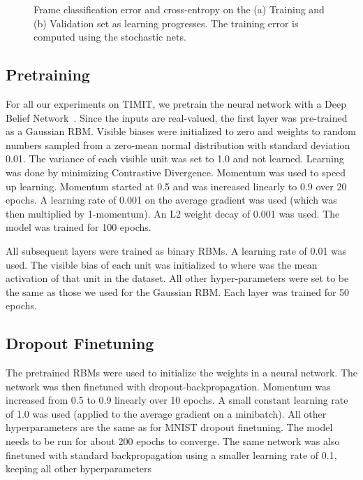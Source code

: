 \documentclass[12pt]{article}
\begin{document}
\begin{figure}[h!]
\centerline{
}
\centerline{
}
\caption{Frame classification error and cross-entropy on the (a) Training and
(b) Validation set as learning progresses. 
The training error is computed using the stochastic nets.}
\label{fig:timit}
\end{figure}

\subsection{Pretraining}
\label{sec:timit_pre}
For all our experiments on TIMIT, we pretrain the neural network with a
Deep Belief Network~\cite{Science}.
Since the inputs are real-valued, the first layer was pre-trained as a Gaussian RBM. Visible biases were initialized
to zero and weights to random numbers sampled from a zero-mean normal distribution with
standard deviation 0.01. The variance of each visible unit was set to 1.0 and
not learned. Learning was done by minimizing Contrastive Divergence. Momentum
was used to speed up learning. Momentum started at 0.5 and was increased
linearly to 0.9 over 20 epochs. A learning rate of 0.001 on the average gradient
was used (which was then multiplied by 1-momentum). An L2 weight decay of 0.001 was used. The model was
trained for 100 epochs.

All subsequent layers were trained as binary RBMs. A learning rate of 0.01 was
used. The visible bias of each unit was initialized to  where 
was the mean activation of that unit in the dataset. All other hyper-parameters
were set to be the same as those we used for the Gaussian RBM. Each layer was trained for 50 epochs.

\subsection{Dropout Finetuning}
\label{sec:timit_dropout}
The pretrained RBMs were used to initialize the weights in a neural network. The
network was then finetuned with dropout-backpropagation.
Momentum was increased from 0.5 to 0.9 linearly over 10 epochs. A small constant learning
rate of 1.0 was used (applied to the average gradient on a minibatch). All other hyperparameters
are the same as for MNIST dropout finetuning. The model needs to be run for
about 200 epochs to converge. The same network was also finetuned with standard
backpropagation using a smaller learning rate of 0.1, keeping all other
hyperparameters 
\end{document}
